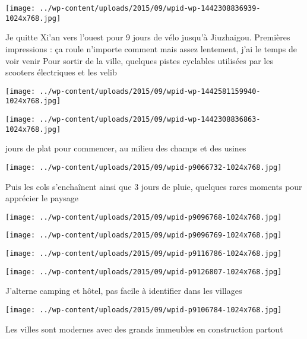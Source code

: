 \centerline{\texttt{[image: ../wp-content/uploads/2015/09/wpid-wp-1442308836939-1024x768.jpg]} } 
 \newline
 Je quitte Xi'an vers l'ouest pour 9 jours de vélo jusqu'à Jiuzhaigou. Premières impressions : ça roule n'importe comment mais assez lentement, j'ai le temps de voir venir \newline
 Pour sortir de la ville, quelques pistes cyclables utilisées par les scooters électriques et les velib \newline
 \newline
\centerline{\texttt{[image: ../wp-content/uploads/2015/09/wpid-wp-1442581159940-1024x768.jpg]} } 
 \newline
 \newline
\centerline{\texttt{[image: ../wp-content/uploads/2015/09/wpid-wp-1442308836863-1024x768.jpg]} } 
  jours de plat pour commencer, au milieu des champs et des usines \newline
 \newline
\centerline{\texttt{[image: ../wp-content/uploads/2015/09/wpid-p9066732-1024x768.jpg]} } 
 \newline
 Puis les cols s'enchaînent ainsi que 3 jours de pluie, quelques rares moments pour apprécier le paysage \newline
 \newline
\centerline{\texttt{[image: ../wp-content/uploads/2015/09/wpid-p9096768-1024x768.jpg]} } 
 \newline
 \newline
\centerline{\texttt{[image: ../wp-content/uploads/2015/09/wpid-p9096769-1024x768.jpg]} } 
 \newline
 \newline
\centerline{\texttt{[image: ../wp-content/uploads/2015/09/wpid-p9116786-1024x768.jpg]} } 
 \newline
 \newline
\centerline{\texttt{[image: ../wp-content/uploads/2015/09/wpid-p9126807-1024x768.jpg]} } 
 \newline
 J'alterne camping et hôtel, pas facile à identifier dans les villages \newline
 \newline
\centerline{\texttt{[image: ../wp-content/uploads/2015/09/wpid-p9106784-1024x768.jpg]} } 
 \newline
 Les villes sont modernes avec des grands immeubles en construction partout \newline
